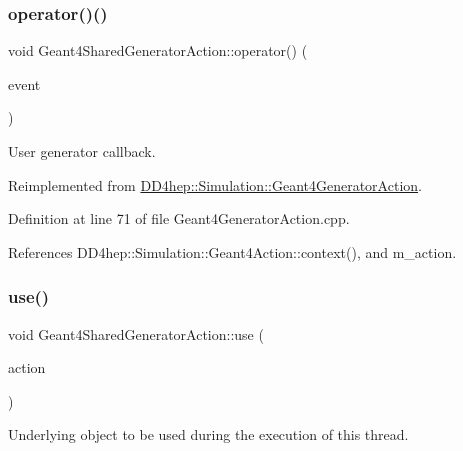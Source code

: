\subsubsection{\texorpdfstring{operator()()}{operator()()}}
{\footnotesize\ttfamily void Geant4\+Shared\+Generator\+Action\+::operator() (\begin{DoxyParamCaption}\item[{G4\+Event $\ast$}]{event }\end{DoxyParamCaption})\hspace{0.3cm}{\ttfamily [virtual]}}



User generator callback. 



Reimplemented from \hyperlink{class_d_d4hep_1_1_simulation_1_1_geant4_generator_action_ac5a1d2335a19e3f9d555081199e01801}{D\+D4hep\+::\+Simulation\+::\+Geant4\+Generator\+Action}.



Definition at line 71 of file Geant4\+Generator\+Action.\+cpp.



References D\+D4hep\+::\+Simulation\+::\+Geant4\+Action\+::context(), and m\+\_\+action.

\hypertarget{class_d_d4hep_1_1_simulation_1_1_geant4_shared_generator_action_af092e3cb7a9419081c990106067fb90c}{}\label{class_d_d4hep_1_1_simulation_1_1_geant4_shared_generator_action_af092e3cb7a9419081c990106067fb90c} 
\subsubsection{\texorpdfstring{use()}{use()}}
{\footnotesize\ttfamily void Geant4\+Shared\+Generator\+Action\+::use (\begin{DoxyParamCaption}\item[{\hyperlink{class_d_d4hep_1_1_simulation_1_1_geant4_generator_action}{Geant4\+Generator\+Action} $\ast$}]{action }\end{DoxyParamCaption})\hspace{0.3cm}{\ttfamily [virtual]}}



Underlying object to be used during the execution of this thread. 



